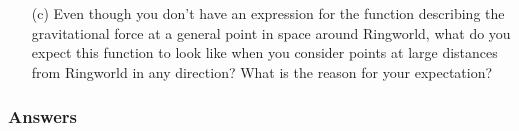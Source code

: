 \documentclass{exam}
\begin{document}
\begin{questions}
\begin{enumerate}
\item[(c)] Even though you don't have an expression for the function describing the gravitational force at a general point in space around Ringworld, what do you expect this function to look like when you consider points at large distances from Ringworld in any direction?  What is the reason for your expectation?

\end{enumerate}


\color{blue}
\subsubsection*{Answers}
\color{black}

\end{questions}
\end{document}
